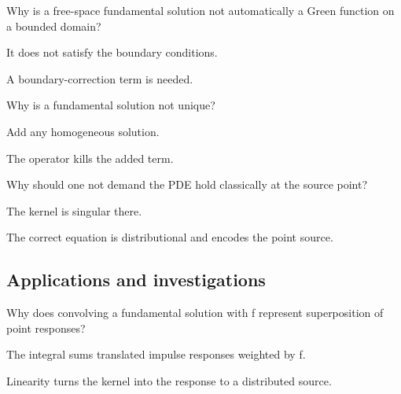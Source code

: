 \begin{exercise}\label{exr:iii24-expand-10}
Why is a free-space fundamental solution not automatically a Green function on a bounded domain?
\end{exercise}
\begin{hint}
It does not satisfy the boundary conditions.
\end{hint}
\begin{solution}
A boundary-correction term is needed.
\end{solution}

\begin{exercise}\label{exr:iii24-expand-11}
Why is a fundamental solution not unique?
\end{exercise}
\begin{hint}
Add any homogeneous solution.
\end{hint}
\begin{solution}
The operator kills the added term.
\end{solution}

\begin{exercise}\label{exr:iii24-expand-12}
Why should one not demand the PDE hold classically at the source point?
\end{exercise}
\begin{hint}
The kernel is singular there.
\end{hint}
\begin{solution}
The correct equation is distributional and encodes the point source.
\end{solution}

\subsection*{Applications and investigations}

\begin{exercise}\label{exr:iii24-expand-13}
Why does convolving a fundamental solution with f represent superposition of point responses?
\end{exercise}
\begin{hint}
The integral sums translated impulse responses weighted by f.
\end{hint}
\begin{solution}
Linearity turns the kernel into the response to a distributed source.
\end{solution}

